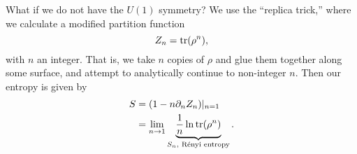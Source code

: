 What if we do not have the $U(1)$ symmetry? We use the ``replica trick,'' where we calculate a modified partition function
\begin{equation}
    Z_n = \operatorname{tr}(\rho^n),
\end{equation}
with $n$ an integer. That is, we take $n$ copies of $\rho$ and glue them together along some surface, and attempt to analytically continue to non-integer $n$. Then our entropy is given by
\begin{align}
    S &= (1-n \partial_n Z_n)|_{n=1}\\
        &= \lim_{n\to 1} \underbrace{\frac{1}{n} \ln \operatorname{tr}(\rho^n)}_{S_n,\text{ R\'enyi entropy}}.
\end{align}